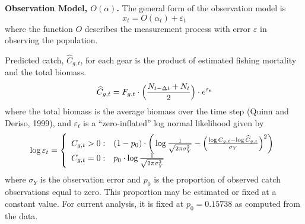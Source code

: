 \documentclass[12pt,letterpaper]{article}
\begin{document}
{\bf Observation Model, $O(\alpha)$.}
The general form of the observation model is
\begin{equation}
x_t = O(\alpha_t) + \varepsilon_t
\end{equation}
where the function $O$ describes the measurement process with
error $\varepsilon$ in observing the population.

Predicted catch, $\widehat{C}_{g,t}$, for each gear is the product of
estimated fishing mortality and the total biomass.
\begin{equation}
\widehat{C}_{g,t} = F_{g,t}\cdot\Bigl(\frac{N_{t-\Delta
t}+N_t}{2}\Bigr) \cdot e^{\varepsilon_t}
\label{eqn:obs1}
\end{equation}
where the total biomass is  the average
biomass over the time step (Quinn and Deriso, 1999), and
$\varepsilon_t$ is a ``zero-inflated'' log normal likelihood given by
\begin{equation}
  \log \varepsilon_t = \left\{
    \begin{array}{r@{\;:\quad}l}
       C_{g,t} > 0 &
(1-p_0)\cdot\bigg(\log\frac{1}{\sqrt{2\pi\sigma^2_Y}}
          -\Bigl(\frac{\log
C_{g,t}-\log\widehat{C}_{g,t}}{\sigma_Y}\Bigr)^2\bigg)\\
       C_{g,t} = 0 & p_0 \cdot\log \frac{1}{\sqrt{2\pi\sigma^2_Y}}\\
    \end{array}
  \right.
\end{equation}
where $\sigma_Y$ is the observation error and
$p_0$ is the proportion of observed catch observations equal to zero.
This proportion may be estimated or fixed at a constant value. For
current analysis, it is fixed at $p_0 = 0.15738$ as computed from the data.
\end{document}
